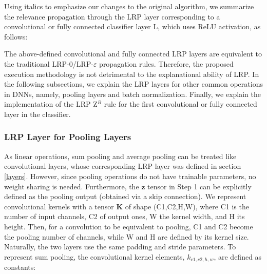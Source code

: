 \documentclass[fleqn,10pt]{wlscirep}
\begin{document}
{Using italics to emphasize our changes to the original algorithm, we summarize the relevance propagation through the LRP layer corresponding to a convolutional or fully connected classifier layer L, which uses ReLU activation, as follows:

The above-defined convolutional and fully connected LRP layers are equivalent to the traditional LRP-0/LRP-$\varepsilon$ propagation rules. Therefore, the proposed execution methodology is not detrimental to the explanational ability of LRP. In the following subsections, we explain the LRP layers for other common operations in DNNs, namely, pooling layers and batch normalization. Finally, we explain the implementation of the LRP Z$^{B}$ rule for the first convolutional or fully connected layer in the classifier.

\subsubsection{LRP Layer for Pooling Layers}
\label{pool}

As linear operations, sum pooling and average pooling can be treated like convolutional layers, whose corresponding LRP layer was defined in section \ref{layers}. However, since pooling operations do not have trainable parameters, no weight sharing is needed. Furthermore, the $\bm{z}$ tensor in Step 1 can be explicitly defined as the pooling output (obtained via a skip connection). We represent convolutional kernels with a tensor $\bm{K}$ of shape (C1,C2,H,W), where C1 is the number of input channels, C2 of output ones, W the kernel width, and H its height. Then, for a convolution to be equivalent to pooling, C1 and C2 become the pooling number of channels, while W and H are defined by its kernel size. Naturally, the two layers use the same padding and stride parameters. To represent sum pooling, the convolutional kernel elements, $k_{c1,c2,h,w}$, are defined as constants:
 
}
\end{document}
